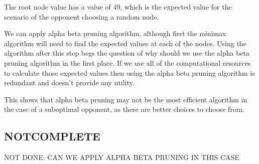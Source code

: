 The root node value has a value of 49, which is the expected value for the scenario of the opponent
choosing a random node.

We can apply alpha beta pruning algorithm, although first the minimax algorithm will need to find the expected values at each of the nodes. Using the algorithm after this step
begs the question of why should we use the alpha beta pruning algorithm in the first place. If we use all of the computational resources to calculate those expected values then
using the alpha beta pruning algorithm is redundant and doesn't provide any utility.

This shows that alpha beta pruning may not be the most efficient algorithm in the case of a suboptimal opponent, as there are better choices to choose from.


\subsection{NOTCOMPLETE}
NOT DONE: CAN WE APPLY ALPHA BETA PRUNING IN THIS CASE

